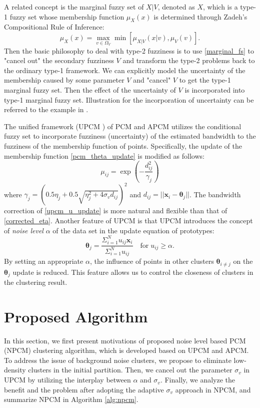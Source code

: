 \documentclass[conference]{IEEEtran}
\theoremstyle{definition}
\begin{document}
A related concept is the marginal fuzzy set of $X|V$, denoted as $X$, which is a type-1 fuzzy set whose membership function $\mu_X(x)$ is determined through Zadeh's Compositional Rule of Inference:
\begin{equation}
\label{marginal_fs}
\mu_X(x)=\max_{v\in\Omega_V}\min[\mu_{X|V}(x|v),\mu_V(v)].
\end{equation}
Then the basic philosophy to deal with type-2 fuzziness is to use \eqref{marginal_fs} to "cancel out" the secondary fuzziness $V$ and transform the type-2 problems back to the ordinary type-1 framework. We can explicitly model the uncertainty of the membership caused by some parameter $V$ and "cancel" $V$ to get the type-1 marginal fuzzy set. Then the effect of the uncertainty of $V$ is incorporated into type-1 marginal fuzzy set.
Illustration for the incorporation of uncertainty can be referred to the example in \cite{hou_pcm_2016}.

The unified framework (UPCM \cite{hou_pcm_2016}) of PCM and APCM utilizes the conditional fuzzy set to incorporate fuzziness (uncertainty) of the estimated bandwidth to the fuzziness of the membership function of points. Specifically, the update of the membership function \eqref{pcm_theta_update} is modified as follows:
\begin{equation}
\label{upcm_u_update}
\mu_{ij}=\exp\left(-\frac{d_{ij}^2}{\gamma_j}\right)
\end{equation}
where $\gamma_j=\left(0.5\eta_{j}+0.5\sqrt{\eta_{j}^{2}+4\sigma_vd_{ij}}\right)^2$ and $d_{ij}=||\mathbf{x}_i-\boldsymbol{\theta}_j||$.
The bandwidth correction of \eqref{upcm_u_update} is more natural and flexible than that of \eqref{corrected_eta}.
Another feature of UPCM is that UPCM introduces the concept of \emph{noise level} $\alpha$ of the data set in the update equation of prototypes:
\begin{equation}
\label{upcm_theta_update}
\boldsymbol{\theta}_j=\frac{\Sigma_{i=1}^Nu_{ij}\mathbf{x}_i}{\Sigma_{i=1}^Nu_{ij}} \quad \text{for}\;u_{ij}\geq \alpha.
\end{equation}
By setting an appropriate $\alpha$, the influence of points in other clusters $\boldsymbol{\theta}_{i\neq j}$ on the $\boldsymbol{\theta}_j$ update is reduced. This feature allows us to control the closeness of clusters in the clustering result.
\section{Proposed Algorithm}
\label{sec-3}
In this section, we first present motivations of proposed noise level based PCM (NPCM) clustering algorithm, which is developed based on UPCM and APCM. To address the issue of background noise clusters, we propose to eliminate low-density clusters in the initial partition. Then, we cancel out the parameter $\sigma_v$ in UPCM by utilizing the interplay between $\alpha$ and $\sigma_v$. Finally, we analyze the benefit and the problem after adopting the adaptive $\sigma_v$ approach in NPCM, and summarize NPCM in Algorithm \ref{alg:npcm}.
\end{document}
